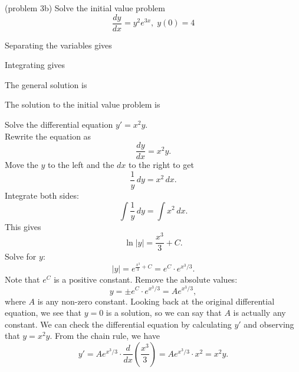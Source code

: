 \documentclass{ximera}
\begin{document}
\begin{problem}(problem 3b)
Solve the initial value problem
\[
\frac{dy}{dx} = y^2e^{3x}, \; y(0) = 4
\]

Separating the variables gives

\begin{multipleChoice}
\end{multipleChoice}

Integrating gives

\begin{multipleChoice}
\end{multipleChoice}

The general solution is

\begin{multipleChoice}
\end{multipleChoice}

The solution to the initial value problem is

\begin{multipleChoice}
\end{multipleChoice}

\end{problem}






\begin{example}[example 4]
Solve the differential equation $y' = x^2y$.\\
Rewrite the equation as 
\[
\frac{dy}{dx} = x^2y.
\]
Move the $y$ to the left and the $dx$ to the right to get
\[
\frac{1}{y} \, dy = x^2 \,  dx.
\]
Integrate both sides:
\[
\int \frac{1}{y}\,  dy  = \int x^2 \, dx.
\]
This gives
\[
\ln|y| = \frac{x^3}{3} + C.
\]
Solve for $y$:
\[
|y| = e^{\frac{x^3}{3} + C} = e^C \cdot e^{x^3/3}.
\]
Note that $e^C$ is a positive constant. Remove the absolute values:
\[
y = \pm e^C \cdot e^{x^3/3} = Ae^{x^3/3},
\]
where $A$ is any non-zero constant. Looking back at the original differential equation, we see that $y = 0$ is a solution, so 
we can say that $A$ is actually any constant.
We can check the differential equation by calculating $y'$ and observing that $y = x^2y$.
From the chain rule, we have
\[
y' = Ae^{x^3/3}\cdot \frac{d}{dx} \left(\frac{x^3}{3}\right) = Ae^{x^3/3} \cdot x^2 = x^2 y.
\]

\end{example}
\end{document}
